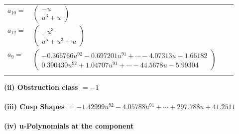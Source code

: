 \documentclass[1p]{elsarticle_modified}
\theoremstyle{definition}
\begin{document}
\begin{tabular}{m{7pt} m{180pt} m{7pt} m{180pt} }
\flushright $a_{10}=$&$\begin{pmatrix}- u\\u^3+u\end{pmatrix}$ \\
\flushright $a_{12}=$&$\begin{pmatrix}- u^3\\u^5+u^3+u\end{pmatrix}$ \\
\flushright $a_{9}=$&$\begin{pmatrix}-0.366766 u^{92}-0.697201 u^{91}+\cdots-4.07313 u-1.66182\\0.390430 u^{92}+1.04707 u^{91}+\cdots-44.5678 u-5.99304\end{pmatrix}$\\&\end{tabular}
\flushleft \textbf{(ii) Obstruction class $= -1$}\\~\\
\flushleft \textbf{(iii) Cusp Shapes $= -1.42999 u^{92}-4.05788 u^{91}+\cdots+297.788 u+41.2511$}\\~\\
\newpage\renewcommand{\arraystretch}{1}
\flushleft \textbf{(iv) u-Polynomials at the component}\newline \\
\end{document}
